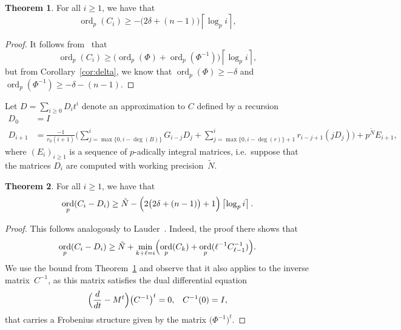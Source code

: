 \documentclass[a4paper,11pt]{article}
\numberwithin{equation}{section}
\providecommand{\ceil}[1]{\left\lceil#1\right\rceil}   %
\DeclareMathOperator{\ord}{ord}          %
\theoremstyle{definition}
\newtheorem{thm}{Theorem}[section]
\begin{document}
\begin{thm} \label{thm:valC}
For all $i \geq 1$, we have that
\begin{equation*}
\ord_p(C_i) \geq - \bigl(2 \delta + (n - 1)\bigr) \ceil{\log_p i},
\end{equation*}
\end{thm}

\begin{proof}
It follows from~\citep[Theorem~{18.3.3}]{Kedlaya2010} that
\begin{equation*}
\ord_p(C_i) \geq \bigl( \ord_p(\Phi) + \ord_p(\Phi^{-1}) \bigr) \ceil{\log_p i},
\end{equation*}
but from Corollary~\ref{cor:delta}, we know that $\ord_p(\Phi) \geq -\delta$ and 
$\ord_p(\Phi^{-1}) \geq -\delta-(n-1)$.
\end{proof}

Let $D=\sum_{i \geq 0} D_i t^i$ denote an approximation to $C$ 
defined by a recursion
\begin{align*}
D_0 &= I \\
D_{i+1} &= \frac{-1}{r_0 (i+1)} \biggl(
    \sum_{j=\max{\{0,i-\deg(B)\}}}^i G_{i-j} D_j + 
    \sum_{j=\max{\{0,i-\deg(r)\}}+1}^i r_{i-j+1} (j D_j) \biggr) + 
    p^{\tilde{N}} E_{i+1},
\end{align*}
where $(E_i)_{i \geq 1}$ is a sequence of $p$-adically integral matrices, 
i.e.\ suppose that the matrices $D_i$ are computed with working 
precision~$\tilde{N}$.

\begin{thm} \label{thm:errorprop}
For all $i \geq 1$, we have that
\begin{equation*}
\ord_p(C_i - D_i) \geq 
    \tilde{N} - \Bigl(2 \bigl(2 \delta + (n-1)\bigr) + 1\Bigr) \ceil{\log_p i}.
\end{equation*}
\end{thm}

\begin{proof}
This follows analogously to
Lauder~\citep[Theorem~5.1]{Lauder2006}.  
Indeed, the proof there shows that 
\begin{equation*}
\ord_p(C_i - D_i) \geq 
    \tilde{N} + \min_{k+\ell=i} \Bigl(\ord_p(C_k) + 
                                      \ord_p(\ell^{-1} C_{\ell-1}^{-1})\Bigr).
\end{equation*}
We use the bound from Theorem~\ref{thm:valC} and observe that it 
also applies to the inverse matrix~$C^{-1}$, as this matrix satisfies 
the dual differential equation 
\begin{equation} \label{eq:01-GMDE-Dual}
\Bigl(\frac{d}{dt} - M^t\Bigr) \bigl(C^{-1}\bigr)^t = 0, \;\;\; C^{-1}(0)=I,
\end{equation}
that carries a Frobenius structure given by the matrix $\bigl(\Phi^{-1}\bigr)^t$. 
\end{proof}
\end{document}
